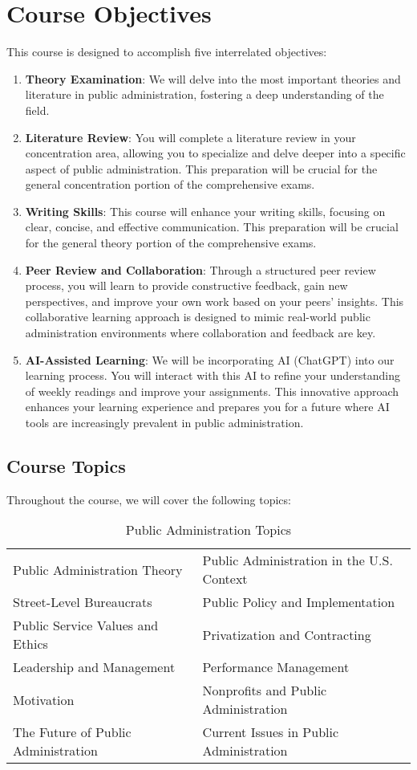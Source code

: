 \documentclass[12pt, letterpaper]{article}
\begin{document}
\section{Course Objectives}
This course is designed to accomplish five interrelated objectives:

\begin{enumerate}
    \item \textbf{Theory Examination}: We will delve into the most important theories and literature in public administration, fostering a deep understanding of the field.
    \item \textbf{Literature Review}: You will complete a literature review in your concentration area, allowing you to specialize and delve deeper into a specific aspect of public administration. This preparation will be crucial for the general concentration portion of the comprehensive exams.
    \item \textbf{Writing Skills}: This course will enhance your writing skills, focusing on clear, concise, and effective communication. This preparation will be crucial for the general theory portion of the comprehensive exams.
    \item \textbf{Peer Review and Collaboration}: Through a structured peer review process, you will learn to provide constructive feedback, gain new perspectives, and improve your own work based on your peers’ insights. This collaborative learning approach is designed to mimic real-world public administration environments where collaboration and feedback are key.
    \item \textbf{AI-Assisted Learning}: We will be incorporating AI (ChatGPT) into our learning process. You will interact with this AI to refine your understanding of weekly readings and improve your assignments. This innovative approach enhances your learning experience and prepares you for a future where AI tools are increasingly prevalent in public administration.
\end{enumerate}

\subsection*{Course Topics}
Throughout the course, we will cover the following topics:
\begin{table}[h]
    \centering
    \caption{Public Administration Topics}
    \begin{tabular}{ll}\hline
        Public Administration Theory & Public Administration in the U.S. Context \\
        Street-Level Bureaucrats & Public Policy and Implementation \\
        Public Service Values and Ethics & Privatization and Contracting \\
        Leadership and Management & Performance Management \\
        Motivation & Nonprofits and Public Administration \\
        The Future of Public Administration & Current Issues in Public Administration \\ \hline
    \end{tabular}
    \label{tab:pa_topics}
    \end{table}
\end{document}
